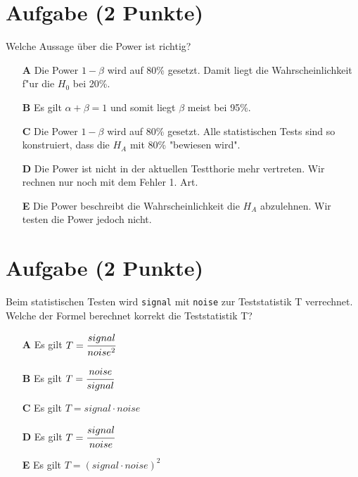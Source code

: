 \documentclass[a4paper, 10pt]{scrartcl}\usepackage[]{graphicx}\usepackage[]{xcolor}
\begin{document}
\section{Aufgabe \hfill (2 Punkte)}

Welche Aussage {\"u}ber die Power ist richtig?



\begin{enumerate}
\item [\textbf{A} \msquare] Die Power $1-\beta$ wird auf 80\% gesetzt. Damit liegt die Wahrscheinlichkeit f{"u}r die $H_0$ bei 20\%.
\item [\textbf{B} \msquare] Es gilt $\alpha + \beta = 1$ und somit liegt $\beta$ meist bei 95\%.
\item [\textbf{C} \msquare] Die Power $1-\beta$ wird auf 80\% gesetzt. Alle statistischen Tests sind so konstruiert, dass die $H_A$ mit 80\% "bewiesen wird".
\item [\textbf{D} \msquare] Die Power ist nicht in der aktuellen Testthorie mehr vertreten. Wir rechnen nur noch mit dem Fehler 1. Art.
\item [\textbf{E} \msquare] Die Power beschreibt die Wahrscheinlichkeit die $H_A$ abzulehnen. Wir testen die Power jedoch nicht.
\end{enumerate}

\section{Aufgabe \hfill (2 Punkte)}

Beim statistischen Testen wird \texttt{signal} mit \texttt{noise} zur
Teststatistik T verrechnet. Welche der Formel berechnet korrekt die
Teststatistik T?



\begin{enumerate}
\item [\textbf{A} \msquare] Es gilt $T = \cfrac{signal}{noise^2}$
\item [\textbf{B} \msquare] Es gilt $T = \cfrac{noise}{signal}$
\item [\textbf{C} \msquare] Es gilt $T = signal \cdot noise$
\item [\textbf{D} \msquare] Es gilt $T = \cfrac{signal}{noise}$
\item [\textbf{E} \msquare] Es gilt $T = (signal \cdot noise)^2$
\end{enumerate}

\end{document}
